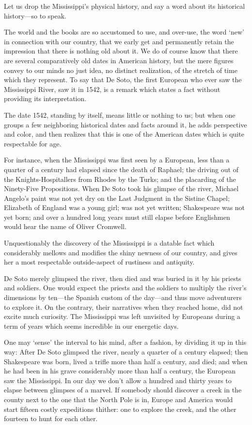 \documentclass[../../../demo.tex]{novelettesubdoc}
\begin{document}

Let us drop the Mississippi's physical history, and say a word about its
historical history---so to speak.

The world and the books are so accustomed to use, and over-use, the word
`new' in connection with our country, that we early get and permanently
retain the impression that there is nothing old about it. We do of
course know that there are several comparatively old dates in American
history, but the mere figures convey to our minds no just idea, no
distinct realization, of the stretch of time which they represent.
To say that De Soto, the first European who ever saw the Mississippi
River, saw it in 1542, is a remark which states a fact without
providing its interpretation.

The date 1542, standing by itself, means little or nothing to us; but
when one groups a few neighboring historical dates and facts around it,
he adds perspective and color, and then realizes that this is one of the
American dates which is quite respectable for age.

For instance, when the Mississippi was first seen by a European, less
than a quarter of a century had elapsed since the death of Raphael;
the driving out of the Knights-Hospitallers from Rhodes by
the Turks; and the placarding of the Ninety-Five Propositions.
When De Soto took his glimpse of the river,
Michael Angelo's paint was not yet dry on the Last
Judgment in the Sistine Chapel; Elizabeth of England was
a young girl;  was not yet written;
Shakespeare was not yet born; and over a hundred long years must
still elapse before Englishmen would hear the name of Oliver Cromwell.

Unquestionably the discovery of the Mississippi is a datable fact which
considerably mellows and modifies the shiny newness of our country, and
gives her a most respectable outside-aspect of rustiness and antiquity.

De Soto merely glimpsed the river, then died and was buried in it by his
priests and soldiers. One would expect the priests and the soldiers
to multiply the river's dimensions by ten---the Spanish custom of the
day---and thus move adventurers to explore it. On the contrary, their
narratives when they reached home, did not excite much curiosity.
The Mississippi was left unvisited by Europeans during a term of years which
seems incredible in our energetic days.

One may `sense' the interval to his mind, after a fashion, by dividing it
up in this way: After De Soto glimpsed the river, nearly
a quarter of a century elapsed; then Shakespeare was born,
lived a trifle more than half a century, and died; and when he had been in
his grave considerably more than half a century, the  European
saw the Mississippi. In our day we don't allow a hundred and thirty years to
elapse between glimpses of a marvel. If somebody should discover a creek
in the county next to the one that the North Pole is in, Europe and
America would start fifteen costly expeditions thither: one to explore
the creek, and the other fourteen to hunt for each other.
\end{document}

